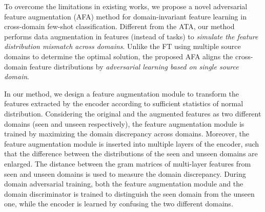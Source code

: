 \documentclass[runningheads]{utils/llncs}
\begin{document}
To overcome the limitations in existing works, we propose a novel adversarial feature augmentation (AFA) method for domain-invariant feature learning in cross-domain few-shot classification.
Different from the ATA, our method performs data augmentation in features (instead of tasks) to \textit{simulate the feature distribution mismatch across domains}.
Unlike the FT using multiple source domains to determine the optimal solution, the proposed AFA aligns the cross-domain feature distributions by \textit{adversarial learning based on single source domain}.


In our method, we design a feature augmentation module to transform the features extracted by the encoder  according to sufficient statistics of normal distribution.
Considering the original and the augmented features as two different domains (seen and unseen respectively), the feature augmentation module is trained by maximizing the domain discrepancy across domains.
Moreover, the feature augmentation module is inserted into multiple layers of the encoder, such that the difference between the distributions of the seen and unseen domains are enlarged.
The distance between the gram matrices of multi-layer features from seen and unseen domains is used to measure the domain discrepancy.
During domain adversarial training, both the feature augmentation module and the domain discriminator is trained to distinguish the seen domain from the unseen one, while the encoder is learned by confusing the two different domains.
\end{document}
